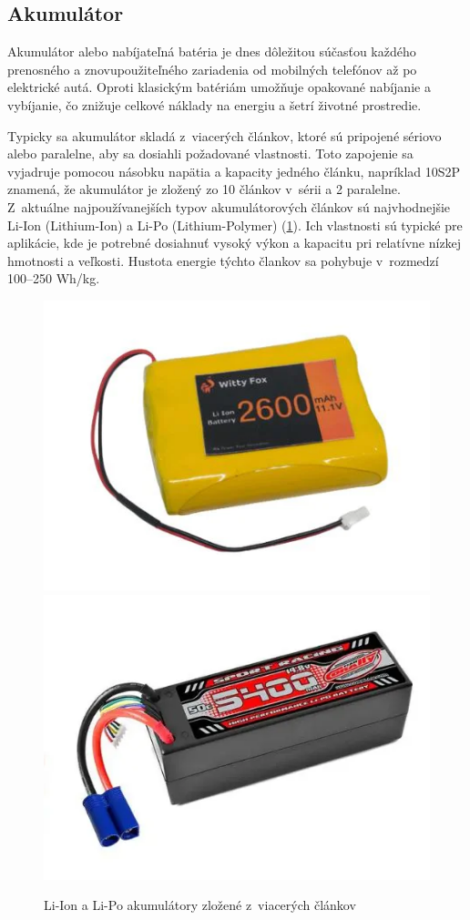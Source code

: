 \subsection{Akumulátor}
Akumulátor alebo nabíjateľná batéria je dnes dôležitou súčasťou každého prenosného a znovupoužiteľného zariadenia od mobilných telefónov až po elektrické autá.
Oproti klasickým batériám umožňuje opakované nabíjanie a vybíjanie, čo znižuje celkové náklady na energiu a šetrí životné prostredie.\cite{Larminie}

Typicky sa akumulátor skladá z~viacerých článkov, ktoré sú pripojené sériovo alebo paralelne, aby sa dosiahli požadované vlastnosti.
Toto zapojenie sa vyjadruje pomocou násobku napätia a kapacity jedného článku, napríklad 10S2P znamená, že akumulátor je zložený zo 10 článkov v~sérii a 2 paralelne.
Z~aktuálne najpoužívanejších typov akumulátorových článkov sú najvhodnejšie Li-Ion (Lithium-Ion) a Li-Po (Lithium-Polymer) (\ref{fig:battery}).
Ich vlastnosti sú typické pre aplikácie, kde je potrebné dosiahnuť vysoký výkon a kapacitu pri relatívne nízkej hmotnosti a veľkosti.
Hustota energie týchto člankov sa pohybuje v~rozmedzí 100--250 Wh/kg.\cite{Itani}\cite{Robocraze}

\begin{figure}[h]
    \centering
    \includegraphics[width=0.48\linewidth]{obrazky-figures/li-ion.png}\hfill
    \includegraphics[width=0.48\linewidth]{obrazky-figures/li-po.png}
    \caption{Li-Ion a Li-Po akumulátory zložené z~viacerých článkov\cite{Robocraze}}\label{fig:battery}
\end{figure}

